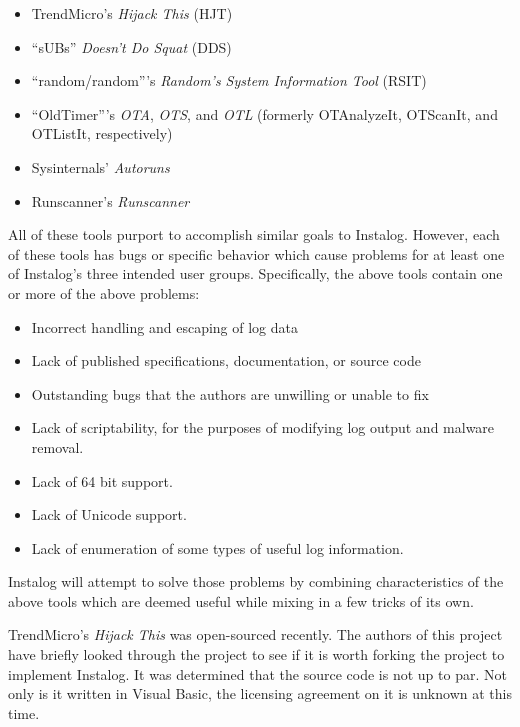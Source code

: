 \documentclass[letterpaper,12pt]{article}
\begin{document}
\begin{itemize}
    \item TrendMicro's {\em Hijack This} (HJT)
    \item ``sUBs'' {\em Doesn't Do Squat} (DDS)
    \item ``random/random'''s {\em Random's System Information Tool} (RSIT)
    \item ``OldTimer'''s {\em OTA}, {\em OTS}, and {\em OTL} (formerly
    OTAnalyzeIt, OTScanIt, and OTListIt, respectively)
    \item Sysinternals' {\em Autoruns}
    \item Runscanner's {\em Runscanner}
\end{itemize}

All of these tools purport to accomplish similar goals to Instalog. However,
each of these tools has bugs or specific behavior which cause problems for at
least one of Instalog's three intended user groups.  Specifically, the above
tools contain one or more of the above problems:

\begin{itemize}
    \item Incorrect handling and escaping of log data
    \item Lack of published specifications, documentation, or source code
    \item Outstanding bugs that the authors are unwilling or unable to fix
    \item Lack of scriptability, for the purposes of modifying log output and
    malware removal.
    \item Lack of 64 bit support.
    \item Lack of Unicode support.
    \item Lack of enumeration of some types of useful log information.
\end{itemize}

Instalog will attempt to solve those problems by combining characteristics of
the above tools which are deemed useful while mixing in a few tricks of its
own.

TrendMicro's {\em Hijack This} was open-sourced recently.  The authors of this
project have briefly looked through the project to see if it is worth forking
the project to implement Instalog.  It was determined that the source code is
not up to par.  Not only is it written in Visual Basic, the licensing agreement
on it is unknown at this time.  
\end{document}
